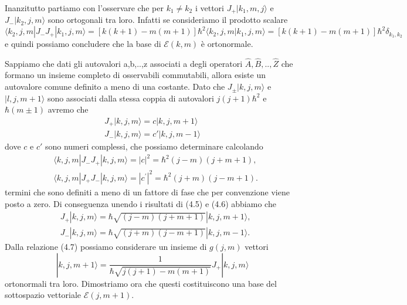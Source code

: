 \noindent Inanzitutto partiamo con l'osservare che per $k_1 \neq k_2$ i vettori $J_+|k_1,m,j \rangle $ e $J_-|k_2,j,m \rangle $ sono ortogonali tra loro. Infatti se consideriamo il prodotto scalare 
\begin{equation*}
	\langle k_2 ,j,m| J_-J_+ | k_1,j,m \rangle = [k(k+1)-m(m+1)]\hbar^2 \langle k_2 ,j,m|k_1,j,m \rangle = [k(k+1)-m(m+1)]\hbar^2 \delta_{k_1,k_2}
\end{equation*}
e quindi possiamo concludere che la base di $\mathcal{E}(k,m)$ \`e ortonormale.

Sappiamo che dati gli autovalori a,b,..,z associati a degli operatori $\hat{A},\hat{B},..,\hat{Z}$ che formano un insieme completo di osservabili commutabili, allora esiste un autovalore comune definito a meno di una costante. Dato che $J_{\pm}|k,j,m \rangle $ e $|l,j,m+1 \rangle $ sono associati dalla stessa coppia di autovalori $j(j+1)\hbar^2$ e $\hbar(m \pm 1)$ avremo che 
\begin{equation}
\begin{array}{l}
	J_+|k,j,m \rangle = c | k,j,m+1 \rangle \\[0.3cm]
	J_-|k,j,m \rangle = c'| k,j,m-1 \rangle 
\end{array}
\end{equation}
dove $c$ e $c'$ sono numeri complessi, che possiamo determinare calcolando
\begin{equation}
\begin{aligned}
& \langle k,j, m| J_{-} J_{+}|k,j, m\rangle=|c|^2=\hbar^2(j-m)(j+m+1), \\
& \langle k,j, m| J_{+} J_{-}|k,j, m\rangle=\left|c^{\prime}\right|^2=\hbar^2(j+m)(j-m+1) .
\end{aligned}
\end{equation}
termini che sono definiti a meno di un fattore di fase che per convenzione viene posto a zero. Di conseguenza unendo i risultati di (4.5) e (4.6) abbiamo che 
\newpage
\begin{equation}
\begin{aligned}
& J_{+}|k,j ,m\rangle=\hbar \sqrt{(j-m)(j+m+1)}|k,j, m+1\rangle, \\
& J_{-}|k,j, m\rangle=\hbar \sqrt{(j+m)(j-m+1)}|k,j, m-1\rangle .
\end{aligned}
\end{equation}
Dalla relazione (4.7) possiamo considerare un insieme di $g(j,m)$ vettori 
\begin{equation}
|k, j, m+1\rangle=\frac{1}{\hbar \sqrt{j(j+1)-m(m+1)}} J_{+}|k, j, m\rangle
\end{equation}
ortonormali tra loro. Dimostriamo ora che questi costituiscono una base del sottospazio vettoriale $\mathcal{E}(j,m+1)$. 

